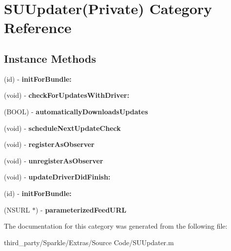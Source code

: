 \hypertarget{category_s_u_updater_07_private_08}{}\section{S\+U\+Updater(Private) Category Reference}
\label{category_s_u_updater_07_private_08}
\subsection*{Instance Methods}
\begin{DoxyCompactItemize}
\item 
\mbox{\label{category_s_u_updater_07_private_08_aade3595bdad5c3dc6f2f91122699a3c7}} 
(id) -\/ {\bfseries init\+For\+Bundle\+:}
\item 
\mbox{\label{category_s_u_updater_07_private_08_abb47f716162a5439c9b8a83704e51d86}} 
(void) -\/ {\bfseries check\+For\+Updates\+With\+Driver\+:}
\item 
\mbox{\label{category_s_u_updater_07_private_08_aabf7de86203b1e753f490a04c81bf1f1}} 
(B\+O\+OL) -\/ {\bfseries automatically\+Downloads\+Updates}
\item 
\mbox{\label{category_s_u_updater_07_private_08_a6268acbc3ded2577e5d9f1f30c175d4d}} 
(void) -\/ {\bfseries schedule\+Next\+Update\+Check}
\item 
\mbox{\label{category_s_u_updater_07_private_08_aaa7e29eff45070c4aa9df301377c748e}} 
(void) -\/ {\bfseries register\+As\+Observer}
\item 
\mbox{\label{category_s_u_updater_07_private_08_a12fd93b722b4e80ae331e98fe5986d86}} 
(void) -\/ {\bfseries unregister\+As\+Observer}
\item 
\mbox{\label{category_s_u_updater_07_private_08_a70f820120b79d8ada4a9fba35f9c3977}} 
(void) -\/ {\bfseries update\+Driver\+Did\+Finish\+:}
\item 
\mbox{\label{category_s_u_updater_07_private_08_aade3595bdad5c3dc6f2f91122699a3c7}} 
(id) -\/ {\bfseries init\+For\+Bundle\+:}
\item 
\mbox{\label{category_s_u_updater_07_private_08_ae0038256da61a6de30dc344aedf10cb2}} 
(N\+S\+U\+RL $\ast$) -\/ {\bfseries parameterized\+Feed\+U\+RL}
\end{DoxyCompactItemize}


The documentation for this category was generated from the following file\+:\begin{DoxyCompactItemize}
\item 
third\+\_\+party/\+Sparkle/\+Extras/\+Source Code/S\+U\+Updater.\+m\end{DoxyCompactItemize}
